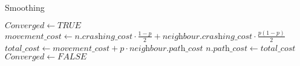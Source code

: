 \begin{algorithm}
    \caption{Smoothing}
    \label{alg:flow}
\begin{algorithmic}[1]
        \State $Converged \gets TRUE$
                \State $\textit{movement\_cost} \gets n.\textit{crashing\_cost} \cdot \frac{1 - p}{2} +  \textit{neighbour}.\textit{crashing\_cost} \cdot \frac{p(1 - p)}{2}$
                \State $\textit{total\_cost} \gets \textit{movement\_cost} + p \cdot \textit{neighbour.path\_cost}$
                    \State $n.\textit{path\_cost} \gets \textit{total\_cost}$
                    \State $Converged \gets FALSE$
                \EndIf
            \EndFor
        \EndFor
    \EndWhile
\end{algorithmic}
\end{algorithm}